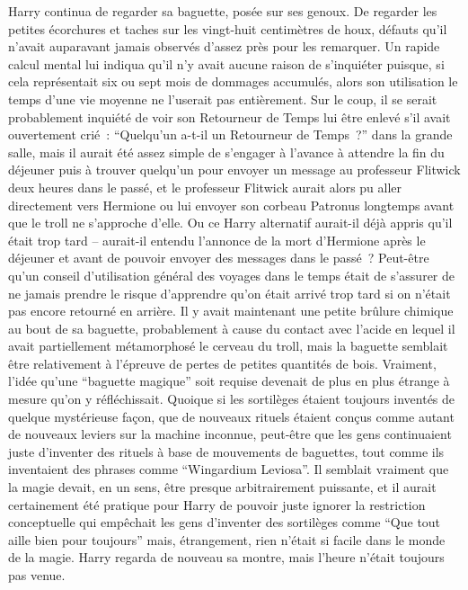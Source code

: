 Harry continua de regarder sa baguette, posée sur ses genoux. De regarder les petites écorchures et taches sur les vingt-huit centimètres de houx, défauts qu'il n'avait auparavant jamais observés d'assez près pour les remarquer. Un rapide calcul mental lui indiqua qu'il n'y avait aucune raison de s'inquiéter puisque, si cela représentait six ou sept mois de dommages accumulés, alors son utilisation le temps d'une vie moyenne ne l'userait pas entièrement. Sur le coup, il se serait probablement inquiété de voir son Retourneur de Temps lui être enlevé s'il avait ouvertement crié~: “Quelqu'un a-t-il un Retourneur de Temps~?” dans la grande salle, mais il aurait été assez simple de s'engager à l'avance à attendre la fin du déjeuner puis à trouver quelqu'un pour envoyer un message au professeur Flitwick deux heures dans le passé, et le professeur Flitwick aurait alors pu aller directement vers Hermione ou lui envoyer son corbeau Patronus longtemps avant que le troll ne s'approche d'elle. Ou ce Harry alternatif aurait-il déjà appris qu'il était trop tard -- aurait-il entendu l'annonce de la mort d'Hermione après le déjeuner et avant de pouvoir envoyer des messages dans le passé~? Peut-être qu'un conseil d'utilisation général des voyages dans le temps était de s'assurer de ne jamais prendre le risque d'apprendre qu'on était arrivé trop tard si on n'était pas encore retourné en arrière. Il y avait maintenant une petite brûlure chimique au bout de sa baguette, probablement à cause du contact avec l'acide en lequel il avait partiellement métamorphosé le cerveau du troll, mais la baguette semblait être relativement à l'épreuve de pertes de petites quantités de bois. Vraiment, l'idée qu'une “baguette magique” soit requise devenait de plus en plus étrange à mesure qu'on y réfléchissait. Quoique si les sortilèges étaient toujours inventés de quelque mystérieuse façon, que de nouveaux rituels étaient conçus comme autant de nouveaux leviers sur la machine inconnue, peut-être que les gens continuaient juste d'inventer des rituels à base de mouvements de baguettes, tout comme ils inventaient des phrases comme “Wingardium Leviosa”. Il semblait vraiment que la magie devait, en un sens, être presque arbitrairement puissante, et il aurait certainement été pratique pour Harry de pouvoir juste ignorer la restriction conceptuelle qui empêchait les gens d'inventer des sortilèges comme “Que tout aille bien pour toujours” mais, étrangement, rien n'était si facile dans le monde de la magie. Harry regarda de nouveau sa montre, mais l'heure n'était toujours pas venue.

